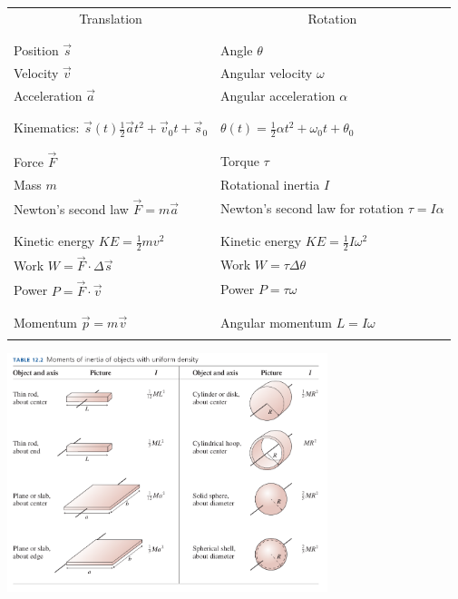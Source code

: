 \documentclass{article}
\begin{document}
\begin{center}
\begin{tabular}{l | l}

 \multicolumn{1}{c|}{\Large Translation} & \multicolumn{1}{c}{\Large Rotation} \\
 \\
\hline
\hline
 & \\
Position $\vec s$ & Angle $\theta$ \\
Velocity $\vec v$ & Angular velocity $\omega$ \\
Acceleration $\vec a$ & Angular acceleration $\alpha$ \\
 & \\
\hline
\hline
 & \\
Kinematics: $\vec s(t)\frac{1}{2}\vec at^2 + \vec v_0 t + \vec s_0$ & $\theta(t) = \frac{1}{2}\alpha t^2 + \omega_0 t + \theta_0$ \\
 & \\
\hline
\hline

 & \\
Force $\vec F$ & Torque $\tau$ \\
Mass $m$ & Rotational inertia $I$ \\
Newton's second law $\vec F = m \vec a$ & Newton's second law for rotation $\tau = I \alpha$ \\
 & \\

\hline
\hline

 & \\
Kinetic energy $KE=\frac{1}{2}mv^2$ & Kinetic energy $KE=\frac{1}{2}I\omega^2$ \\
Work $W = \vec F \cdot \Delta \vec s$ & Work $W = \tau \Delta \theta$ \\
Power $P = \vec F \cdot \vec v$ & Power $P = \tau \omega$ \\
 & \\

\hline
\hline

 & \\
Momentum $\vec p = m \vec v$ & Angular momentum $L = I\omega$\\
 & \\

\hline
\end{tabular}

\bigskip

\includegraphics[width=0.7\textwidth]{moment-table.png}

\end{center}
\end{document}
